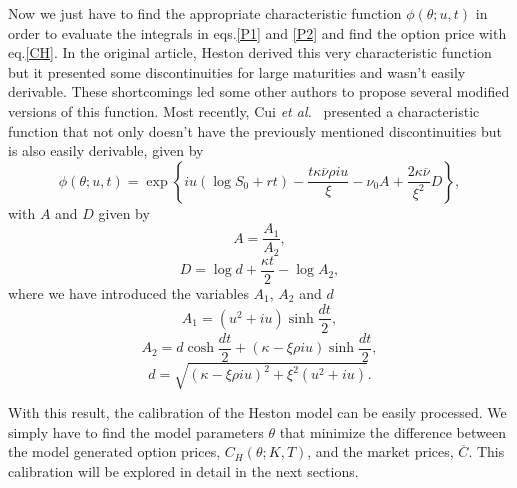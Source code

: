 Now we just have to find the appropriate characteristic function $\phi(\theta;u,t)$ in order to evaluate the integrals in eqs.\eqref{P1} and \eqref{P2} and find the option price with eq.\eqref{CH}. In the original article, Heston derived this very characteristic function~\cite{Heston} but it presented some discontinuities for large maturities and wasn't easily derivable. These shortcomings led some other authors to propose several modified versions of this function. Most recently, Cui \textit{et al.}~\citep{Cui} presented a characteristic function that not only doesn't have the previously mentioned discontinuities but is also easily derivable, given by
\begin{equation}
\phi(\theta;u,t)=\exp\left\{iu\left(\log S_0+rt\right)-\frac{t\kappa\overline{\nu}\rho iu}{\xi}-\nu_0A+\frac{2\kappa\overline{\nu}}{\xi^2}D\right\},
\end{equation}
\noindent with $A$ and $D$ given by
\begin{equation}
A=\frac{A_1}{A_2},
\end{equation}
\begin{equation}
D=\log d+\frac{\kappa t}{2}-\log A_2,
\end{equation}
\noindent where we have introduced the variables $A_1$, $A_2$ and $d$ 
\begin{equation}
A_1=(u^2+iu)\sinh\frac{dt}{2},
\end{equation}
\begin{equation}
A_2=d\cosh\frac{dt}{2}+(\kappa -\xi\rho iu)\sinh\frac{dt}{2},
\end{equation}
\begin{equation}
d=\sqrt{(\kappa-\xi\rho iu)^2+\xi^2(u^2+iu)}.
\end{equation}

With this result, the calibration of the Heston model can be easily processed. We simply have to find the model parameters $\theta$ that minimize the difference between the model generated option prices, $C_H(\theta;K,T)$, and the market prices, $\overline{C}$. This calibration will be explored in detail in the next sections.

\iffalse
Calibrating the parameters  $\rho$, $\kappa$, $\overline{\nu}$ and $\xi$ is absolutely critical. A model with badly calibrated parameters would output wrong predictions, rendering it completely useless.
This calibration requires a fair amount of past market data and is by far the most complex and computationally demanding section of this model. We will deal with it in the next section.
\fi





